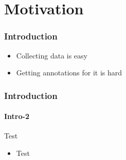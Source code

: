 \section{Motivation}
\begin{frame}
	\frametitle{Introduction}
	\begin{itemize}
		\item Collecting data is easy
		\item Getting annotations for it is hard
	\end{itemize}
\end{frame}

\begin{frame}
	\frametitle{Introduction}
	\framesubtitle{Intro-2}
	Test
	\begin{itemize}
		\item Test
	\end{itemize}
\end{frame}

